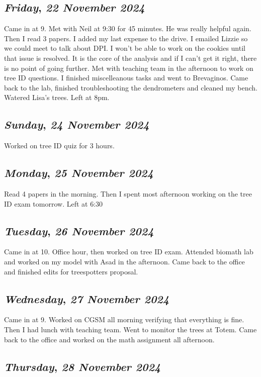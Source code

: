 \def\day{\textit{22 November 2024}}
\def\weekday{\textit{Friday}}
\subsection*{\weekday, \day}
Came in at 9. Met with Neil at 9:30 for 45 minutes. He was really helpful again. Then I read 3 papers. I added my last expense to the drive. I emailed Lizzie so we could meet to talk about DPI. I won't be able to work on the cookies until that issue is resolved. It is the core of the analysis and if I can't get it right, there is no point of going further. Met with teaching team in the afternoon to work on tree ID questions. I finished miscelleanous tasks and went to Brevaginos. Came back to the lab, finished troubleshooting the dendrometers and cleaned my bench. Watered Lisa's trees. Left at 8pm. 

\def\day{\textit{24 November 2024}}
\def\weekday{\textit{Sunday}}
\subsection*{\weekday, \day}
Worked on tree ID quiz for 3 hours. 

\def\day{\textit{25 November 2024}}
\def\weekday{\textit{Monday}}
\subsection*{\weekday, \day}
Read 4 papers in the morning. Then I spent most afternoon working on the tree ID exam tomorrow. Left at 6:30

\def\day{\textit{26 November 2024}}
\def\weekday{\textit{Tuesday}}
\subsection*{\weekday, \day}
Came in at 10. Office hour, then worked on tree ID exam. Attended biomath lab and worked on my model with Asad in the afternoon. Came back to the office and finished edits for treespotters proposal.

\def\day{\textit{27 November 2024}}
\def\weekday{\textit{Wednesday}}
\subsection*{\weekday, \day}
Came in at 9. Worked on CGSM all morning verifying that everything is fine. Then I had lunch with teaching team. Went to monitor the trees at Totem. Came back to the office and worked on the math assignment all afternoon.
\def\day{\textit{28 November 2024}}
\def\weekday{\textit{Thursday}}
\subsection*{\weekday, \day}


